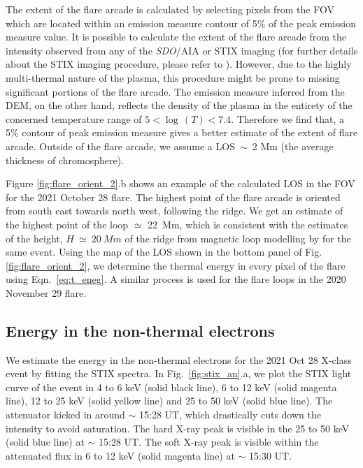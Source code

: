 The extent of the flare arcade is calculated by selecting pixels from the FOV which are located within an emission measure contour of 5\% of the peak emission measure value. It is possible to calculate the extent of the flare arcade from the intensity observed from any of the {\it SDO}/AIA or STIX imaging (for further details about the STIX imaging procedure, please refer to \cite{massa20}). However, due to the highly multi-thermal nature of the plasma, this procedure might be prone to missing significant portions of the flare arcade. The emission measure inferred from the DEM, on the other hand, reflects the density of the plasma in the entirety of the concerned temperature range of $5<\log\,(T)<7.4$. Therefore we find that, a 5\% contour of peak emission measure gives a better estimate of the extent of flare arcade. Outside of the flare arcade, we assume a LOS~$\sim$~2 Mm (the average thickness of chromosphere). 

Figure \ref{fig:flare_orient_2}.b shows an example of the calculated LOS in the FOV for the 2021 October 28 flare. The highest point of the flare arcade is oriented from south east towards north west, following the ridge. We get an estimate of the highest point of the loop $\simeq$ 22~Mm, which is consistent with the estimates of the height, $H~\simeq~20~Mm$ of the ridge from magnetic loop modelling by \cite{longcope22} for the same event. Using the map of the LOS shown in the bottom panel of Fig. \ref{fig:flare_orient_2}, we determine the thermal energy in every pixel of the flare using Eqn.~\ref{eq:t_eneg}.  A similar process is used for the flare loops in the 2020 November 29 flare.

\subsection{Energy in the non-thermal electrons}\label{sec:non-therm}

We estimate the energy in the non-thermal electrons for the 2021 Oct 28 X-class event by fitting the STIX spectra. In Fig.~\ref{fig:stix_an}.a, we plot the STIX light curve of the event in 4 to 6 keV (solid black line), 6 to 12 keV (solid magenta line), 12 to 25 keV (solid yellow line) and 25 to 50 keV (solid blue line). The attenuator kicked in around $\sim$ 15:28 UT, which drastically cuts down the intensity to avoid saturation. The hard X-ray peak is visible in the 25 to 50 keV (solid blue line) at $\sim$ 15:28 UT. The soft X-ray peak is visible within the attenuated flux in 6 to 12 keV (solid magenta line) at $\sim$ 15:30 UT.

